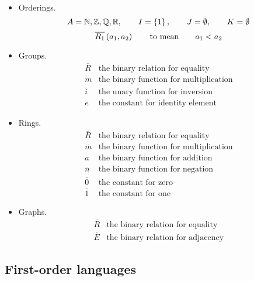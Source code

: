 \begin{example}
\label{eg:2.1.3}
\hfill
\begin{itemize}
\item Orderings.
$$ A = \NN, \ZZ, \QQ, \RR, \qquad I = \cbr{1}, \qquad J = \emptyset, \qquad K = \emptyset $$
$$ \overline{R_1}\br{a_1, a_2} \qquad \text{to mean} \qquad a_1 < a_2 $$
\item Groups.
$$
\begin{array}{ll}
\overline{R} & \text{the binary relation for equality} \\
\overline{m} & \text{the binary function for multiplication} \\
\overline{i} & \text{the unary function for inversion} \\
\overline{e} & \text{the constant for identity element}
\end{array}
$$
\item Rings.
$$
\begin{array}{ll}
\overline{R} & \text{the binary relation for equality} \\
\overline{m} & \text{the binary function for multiplication} \\
\overline{a} & \text{the binary function for addition} \\
\overline{n} & \text{the binary function for negation} \\
\overline{0} & \text{the constant for zero} \\
\overline{1} & \text{the constant for one}
\end{array}
$$
\item Graphs.
$$
\begin{array}{ll}
\overline{R} & \text{the binary relation for equality} \\
\overline{E} & \text{the binary relation for adjacency}
\end{array}
$$
\end{itemize}
\end{example}

\subsection{First-order languages}

